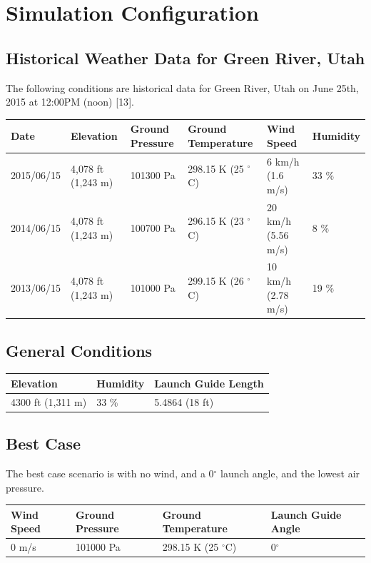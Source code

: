 \documentclass[]{book}
\begin{document}
\section{Simulation Configuration}\label{simulation-configuration}

\subsection{Historical Weather Data for Green River,
Utah}\label{historical-weather-data-for-green-river-utah}

The following conditions are historical data for Green River, Utah on
June 25th, 2015 at 12:00PM (noon) {[}13{]}.

\begin{longtable}[c]{@{}llllll@{}}
\toprule
Date & Elevation & Ground Pressure & Ground Temperature & Wind Speed &
Humidity\tabularnewline
\midrule
\endhead
2015/06/15 & 4,078 ft (1,243 m) & 101300 Pa & 298.15 K (25 \(^\circ\)C)
& 6 km/h (1.6 m/s) & 33 \%\tabularnewline
2014/06/15 & 4,078 ft (1,243 m) & 100700 Pa & 296.15 K (23 \(^\circ\)C)
& 20 km/h (5.56 m/s) & 8 \%\tabularnewline
2013/06/15 & 4,078 ft (1,243 m) & 101000 Pa & 299.15 K (26 \(^\circ\)C)
& 10 km/h (2.78 m/s) & 19 \%\tabularnewline
\bottomrule
\end{longtable}


\subsection{General Conditions}\label{general-conditions}

\begin{longtable}[c]{@{}lll@{}}
\toprule
Elevation & Humidity & Launch Guide Length\tabularnewline
\midrule
\endhead
4300 ft (1,311 m) & 33 \% & 5.4864 (18 ft)\tabularnewline
\bottomrule
\end{longtable}


\subsection{Best Case}\label{best-case}

The best case scenario is with no wind, and a 0\(^\circ\) launch angle,
and the lowest air pressure.

\begin{longtable}[c]{@{}llll@{}}
\toprule
Wind Speed & Ground Pressure & Ground Temperature & Launch Guide
Angle\tabularnewline
\midrule
\endhead
0 m/s & 101000 Pa & 298.15 K (25 \(^\circ\)C) &
0\(^\circ\)\tabularnewline
\bottomrule
\end{longtable}
\end{document}

